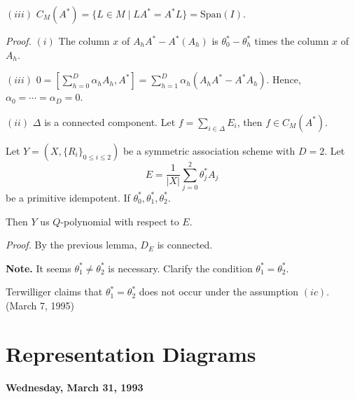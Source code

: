 \documentclass[
]{book}
\theoremstyle{definition}
\theoremstyle{definition}
\theoremstyle{definition}
\theoremstyle{definition}
\theoremstyle{remark}
\begin{document}
\((iii)\) \(C_M(A^*) = \{L\in M\mid LA^* = A^*L\} = \mathrm{Span}(I).\)

\emph{Proof.}
\textbar{} \((i)\) The column \(x\) of \(A_hA^* - A^*(A_h)\) is \(\theta^*_0-\theta^*_h\) times the column \(x\) of \(A_h\).

\((iii)\) \({\displaystyle 0 = [\sum_{h=0}^D\alpha_hA_h, A^*] = \sum_{h=1}^D\alpha_h(A_hA^*-A^*A_h)}\). Hence, \(\alpha_0 = \cdots =\alpha_D = 0\).

\((ii)\) \(\Delta\) is a connected component. Let \(f = \sum_{i\in \Delta}E_i\), then \(f\in C_M(A^*)\).

Let \(Y = (X, \{R_i\}_{0\leq i\leq 2})\) be a symmetric association scheme with \(D = 2\). Let
\[E = \frac{1}{|X|}\sum_{j=0}^2\theta^*_j A_j\]
be a primitive idempotent. If \(\theta^*_0, \theta_1^*, \theta^*_2\).

Then \(Y\) us \(Q\)-polynomial with respect to \(E\).

\emph{Proof.}
By the previous lemma, \(D_E\) is connected.

\textbf{Note.}
It seems \(\theta^*_1 \neq \theta^*_2\) is necessary. Clarify the condition \(\theta^*_1 = \theta^*_2\).

Terwilliger claims that \(\theta^*_1 = \theta^*_2\) does not occur under the assumption \((ic)\). (March 7, 1995)

\hypertarget{lec26}{%
\chapter{Representation Diagrams}\label{lec26}}

\textbf{Wednesday, March 31, 1993}
\end{document}
